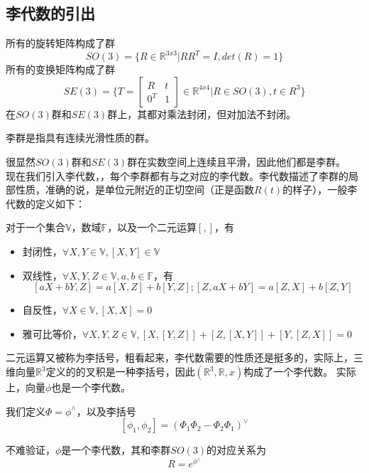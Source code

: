 \subsection{李代数的引出}
所有的旋转矩阵构成了群
\[
    SO(3) = \{R \in \mathbb{R}^{3x3} | RR^T = I, det(R) = 1\}
\]
所有的变换矩阵构成了群
\[
    SE(3) = \{T = \begin{bmatrix} R & t \\ 0^T & 1\end{bmatrix} \in \mathbb{R}^{4x4} | R \in SO(3), t \in R^3\}
\]
在\(SO(3)\)群和\(SE(3)\)群上，其都对乘法封闭，但对加法不封闭。
\begin{definition}
李群是指具有连续光滑性质的群。
\end{definition}
很显然\(SO(3)\)群和\(SE(3)\)群在实数空间上连续且平滑，因此他们都是李群。\\
现在我们引入李代数，，每个李群都有与之对应的李代数。李代数描述了李群的局部性质，准确的说，是单位元附近的正切空间（正是函数\(R(t)\)的样子），一般李代数的定义如下：
\begin{definition}
对于一个集合\(\mathbb{V}\)，数域\(\mathbb{F}\)，以及一个二元运算\([,]\)，有
\begin{itemize}
    \item 封闭性，\(\forall X, Y \in \mathbb{V}, [X, Y] \in \mathbb{V}\)
    \item 双线性，\(\forall X, Y, Z \in \mathbb{V}, a, b \in \mathbb{F}\)，有
        \[
            [aX + bY, Z] = a[X, Z] + b[Y, Z]; [Z, aX + bY] = a[Z, X] + b[Z, Y]
        \]
    \item 自反性，\(\forall X \in \mathbb{V}, [X, X]=0\)
    \item 雅可比等价，\(\forall X, Y, Z \in \mathbb{V}, [X, [Y, Z]] + [Z, [X, Y]] + [Y, [Z, X]] = 0\)
\end{itemize}
\end{definition}
二元运算又被称为李括号，粗看起来，李代数需要的性质还是挺多的，实际上，三维向量\(\mathbb{R}^3\)定义的的叉积是一种李括号，因此\((\mathbb{R}^3, \mathbb{R}, x)\)构成了一个李代数。{\color{red} 实际上，向量\(\phi\)也是一个李代数。}
\begin{definition}
我们定义\(\Phi = \phi^\wedge\)，以及李括号
\[
    [\phi_1, \phi_2] = (\Phi_1\Phi_2-\Phi_2\Phi_1)^\vee
\]
\end{definition}
不难验证，\(\phi\)是一个李代数，其和李群\(SO(3)\)的对应关系为
\[
    R = e^{\phi^\wedge}
\]


